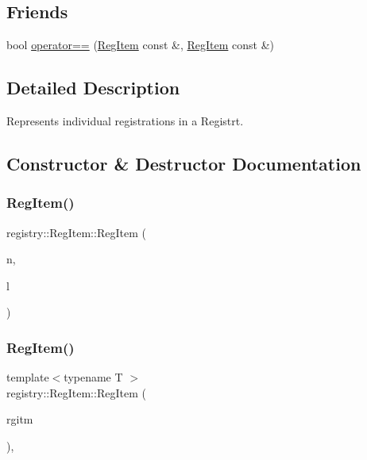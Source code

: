 \subsection*{Friends}
\begin{DoxyCompactItemize}
\item 
bool \hyperlink{classregistry_1_1RegItem_af3b610d326e264953225a12b91289737}{operator==} (\hyperlink{classregistry_1_1RegItem}{Reg\+Item} const \&, \hyperlink{classregistry_1_1RegItem}{Reg\+Item} const \&)
\end{DoxyCompactItemize}


\subsection{Detailed Description}
Represents individual registrations in a Registrt. 

\subsection{Constructor \& Destructor Documentation}
\mbox{\label{classregistry_1_1RegItem_a48dc2248826d62afab2a3c11c3d18b96}} 
\subsubsection{\texorpdfstring{Reg\+Item()}{RegItem()}\hspace{0.1cm}{\footnotesize\ttfamily [1/4]}}
{\footnotesize\ttfamily registry\+::\+Reg\+Item\+::\+Reg\+Item (\begin{DoxyParamCaption}\item[{std\+::string const \&}]{n,  }\item[{\hyperlink{structregistry_1_1BufferLocation}{Buffer\+Location}}]{l }\end{DoxyParamCaption})\hspace{0.3cm}{\ttfamily [inline]}}

\mbox{\label{classregistry_1_1RegItem_a5950e2cc917cad4d833e5e80a29e06b5}} 
\subsubsection{\texorpdfstring{Reg\+Item()}{RegItem()}\hspace{0.1cm}{\footnotesize\ttfamily [2/4]}}
{\footnotesize\ttfamily template$<$typename T $>$ \\
registry\+::\+Reg\+Item\+::\+Reg\+Item (\begin{DoxyParamCaption}\item[{T const \&}]{rgitm }\end{DoxyParamCaption})\hspace{0.3cm}{\ttfamily [inline]}, {\ttfamily [explicit]}}


